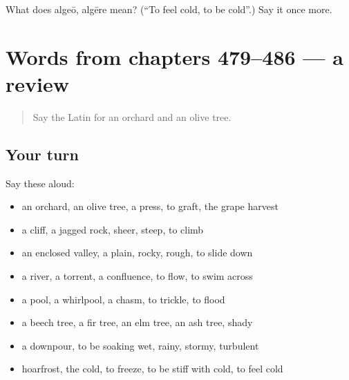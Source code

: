 \begin{tcolorbox}[breakable,colback=teal!4,colframe=teal!35!black,title={Before you move on}]
What does algeō, algēre mean? (\textquotedblleft{}To feel cold, to be cold\textquotedblright{}.) Say it once more.
\end{tcolorbox}
\section[(dialogue)]{Words from chapters 479–486 — a review}

\label{lesson:LA-R486-review-479-486}



\begin{quote}
Say the Latin for an orchard and an olive tree.
\end{quote}

\subsection*{Your turn}
Say these aloud:

\begin{itemize}
\raggedright
  \item an orchard, an olive tree, a press, to graft, the grape harvest
  \item a cliff, a jagged rock, sheer, steep, to climb
  \item an enclosed valley, a plain, rocky, rough, to slide down
  \item a river, a torrent, a confluence, to flow, to swim across
  \item a pool, a whirlpool, a chasm, to trickle, to flood
  \item a beech tree, a fir tree, an elm tree, an ash tree, shady
  \item a downpour, to be soaking wet, rainy, stormy, turbulent
  \item hoarfrost, the cold, to freeze, to be stiff with cold, to feel cold
\end{itemize}

